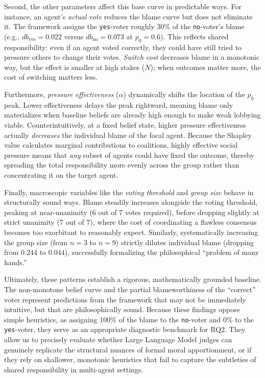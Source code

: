 \documentclass{article}
\begin{document}
Second, the other parameters affect this base curve in predictable ways. For instance, an agent's \textit{actual vote} reduces the blame curve but does not eliminate it. The framework assigns the \texttt{yes}-voter roughly 30\% of the \texttt{no}-voter's blame (e.g., $db_\text{yes} = 0.022$ versus $db_\text{no} = 0.073$ at $p_0 = 0.6$). This reflects shared responsibility: even if an agent voted correctly, they could have still tried to pressure others to change their votes. \textit{Switch cost} decreases blame in a monotonic way, but the effect is smaller at high stakes ($N$); when outcomes matter more, the cost of switching matters less. 

Furthermore, \textit{pressure effectiveness} ($\alpha$) dynamically shifts the location of the $p_0$ peak. Lower effectiveness delays the peak rightward, meaning blame only materializes when baseline beliefs are already high enough to make weak lobbying viable. Counterintuitively, at a fixed belief state, higher pressure effectiveness actually \textit{decreases} the individual blame of the focal agent. Because the Shapley value calculates marginal contributions to coalitions, highly effective social pressure means that \textit{any} subset of agents could have fixed the outcome, thereby spreading the total responsibility more evenly across the group rather than concentrating it on the target agent. 

Finally, macroscopic variables like the \textit{voting threshold} and \textit{group size} behave in structurally sound ways. Blame steadily increases alongside the voting threshold, peaking at near-unanimity (6 out of 7 votes required), before dropping slightly at strict unanimity (7 out of 7), where the cost of coordinating a flawless consensus becomes too exorbitant to reasonably expect. Similarly, systematically increasing the group size (from $n=3$ to $n=9$) strictly dilutes individual blame (dropping from $0.244$ to $0.044$), successfully formalizing the philosophical ``problem of many hands.''

Ultimately, these patterns establish a rigorous, mathematically grounded baseline. The non-monotone belief curve and the partial blameworthiness of the ``correct'' voter represent predictions from the framework that may not be immediately intuitive, but that are philosophically sound. Because these findings oppose simple heuristics,  as assigning 100\% of the blame to the \texttt{no}-voter and 0\% to the \texttt{yes}-voter, they serve as an appropriate diagnostic benchmark for RQ2. They allow us to precisely evaluate whether Large Language Model judges can genuinely replicate the structural nuances of formal moral apportionment, or if they rely on shallower, monotonic heuristics that fail to capture the subtleties of shared responsibility in multi-agent settings.
\end{document}
